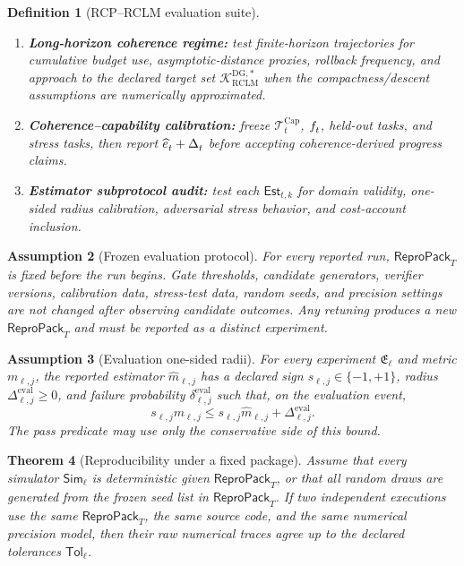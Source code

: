 \documentclass[11pt,a4paper]{article}
\newtheorem{theorem}{Theorem}[section]
\newtheorem{definition}[theorem]{Definition}
\newtheorem{assumption}[theorem]{Assumption}
\newcommand{\Kcal}{\mathcal K}
\newcommand{\Tcal}{\mathcal T}
\newcommand{\RCLM}{\mathrm{RCLM}}
\newcommand{\DG}{\mathrm{DG}}
\providecommand{\Cap}{\operatorname{Cap}}
\newcommand{\eval}{\mathrm{eval}}
\begin{document}
\begin{definition}[RCP--RCLM evaluation suite]
\begin{enumerate}[label=\textbf{E\arabic*.}, leftmargin=2em]
    \item \textbf{Long-horizon coherence regime:} test finite-horizon trajectories for cumulative budget use, asymptotic-distance proxies, rollback frequency, and approach to the declared target set \(\Kcal_{\RCLM}^{\DG,*}\) when the compactness/descent assumptions are numerically approximated.
    \item \textbf{Coherence--capability calibration:} freeze \(\Tcal_t^{\Cap}\), \(f_t^{\cal}\), held-out tasks, and stress tasks, then report \(\widehat e_t^{\cal}+\Delta_t^{\cal}\) before accepting coherence-derived progress claims.
    \item \textbf{Estimator subprotocol audit:} test each \(\mathsf{Est}_{t,k}\) for domain validity, one-sided radius calibration, adversarial stress behavior, and cost-account inclusion.
\end{enumerate}
\end{definition}

\begin{assumption}[Frozen evaluation protocol]
\label{assump:frozen-eval}
For every reported run, \(\mathsf{ReproPack}_T\) is fixed before the run begins.  Gate thresholds, candidate generators, verifier versions, calibration data, stress-test data, random seeds, and precision settings are not changed after observing candidate outcomes.  Any retuning produces a new \(\mathsf{ReproPack}_T\) and must be reported as a distinct experiment.
\end{assumption}

\begin{assumption}[Evaluation one-sided radii]
\label{assump:eval-one-sided}
For every experiment \(\mathfrak E_\ell\) and metric \(m_{\ell,j}\), the reported estimator \(\widehat m_{\ell,j}\) has a declared sign \(s_{\ell,j}\in\{-1,+1\}\), radius \(\Delta_{\ell,j}^{\eval}\ge0\), and failure probability \(\delta_{\ell,j}^{\eval}\) such that, on the evaluation event,
\[
s_{\ell,j}m_{\ell,j}
\le
s_{\ell,j}\widehat m_{\ell,j}+\Delta_{\ell,j}^{\eval}.
\]
The pass predicate may use only the conservative side of this bound.
\end{assumption}

\begin{theorem}[Reproducibility under a fixed package]
\label{thm:reproducibility-fixed-package}
Assume that every simulator \(\mathsf{Sim}_\ell\) is deterministic given \(\mathsf{ReproPack}_T\), or that all random draws are generated from the frozen seed list in \(\mathsf{ReproPack}_T\).  If two independent executions use the same \(\mathsf{ReproPack}_T\), the same source code, and the same numerical precision model, then their raw numerical traces agree up to the declared tolerances \(\mathsf{Tol}_\ell\).
\end{theorem}
\end{document}

